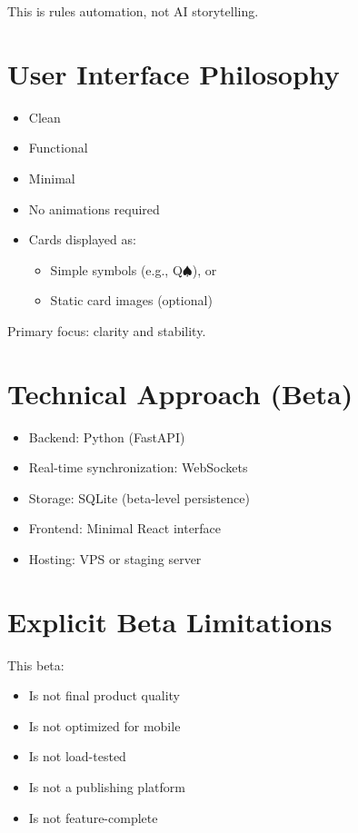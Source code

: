 \documentclass[11pt,a4paper]{article}
\begin{document}
This is rules automation, not AI storytelling.

\section{User Interface Philosophy}

\begin{itemize}[leftmargin=2em]
    \item Clean
    \item Functional
    \item Minimal
    \item No animations required
    \item Cards displayed as:
        \begin{itemize}
            \item Simple symbols (e.g., Q$\spadesuit$), or
            \item Static card images (optional)
        \end{itemize}
\end{itemize}

Primary focus: clarity and stability.

\section{Technical Approach (Beta)}

\begin{itemize}[leftmargin=2em]
    \item Backend: Python (FastAPI)
    \item Real-time synchronization: WebSockets
    \item Storage: SQLite (beta-level persistence)
    \item Frontend: Minimal React interface
    \item Hosting: VPS or staging server
\end{itemize}

\section{Explicit Beta Limitations}

This beta:

\begin{itemize}[leftmargin=2em]
    \item Is not final product quality
    \item Is not optimized for mobile
    \item Is not load-tested
    \item Is not a publishing platform
    \item Is not feature-complete
\end{itemize}
\end{document}
